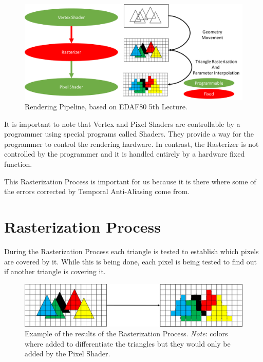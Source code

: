 \documentclass{cslthse-msc}
\begin{document}
\begin{figure}[!hbt]
	\centering
	\includegraphics[scale=0.5]{images/graphics_pipeline.png} 
	\caption{Rendering Pipeline, based on EDAF80 5th Lecture.~\cite{Doggett2017EDAF80}}\label{fig:graphpipeline}
\end{figure}

It is important to note that Vertex and Pixel Shaders are controllable by a programmer using special programs called Shaders. They provide a way for the programmer to control the rendering hardware. In contrast, the Rasterizer is not controlled by the programmer and it is handled entirely by a hardware fixed function. \cite{Doggett2017EDAF80}

This Rasterization Process is important for us because it is there where some of the errors corrected by Temporal Anti-Aliasing come from.

\section{Rasterization Process}
During the Rasterization Process each triangle is tested to establish which pixels are covered by it. While this is being done, each pixel is being tested to find out if another triangle is covering it.

\begin{figure}[!hbt]
	\centering
	\includegraphics[scale=0.75]{images/rasterization_process.png} 
	\caption{Example of the results of the Rasterization Process.
		\emph{Note}: colors where added to differentiate the triangles but they would only be added by the Pixel Shader.
	}\label{fig:rasterizationproc}
\end{figure}
\end{document}
